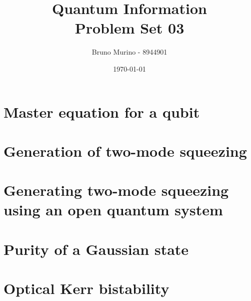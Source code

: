 \documentclass{_mypackages/monograph}
\title{Quantum Information \\ Problem Set 03} %
\author{Bruno Murino - 8944901} %
\date{\today} %
\begin{document}

\solutionstp
\pagestyle{onlypagenum}
\tableofcontents

\chapter{Master equation for a qubit}









\chapter{Generation of two-mode squeezing}









\chapter{Generating two-mode squeezing using an open quantum system}









\chapter{Purity of a Gaussian state}








\chapter{Optical Kerr bistability}
















































\end{document}
